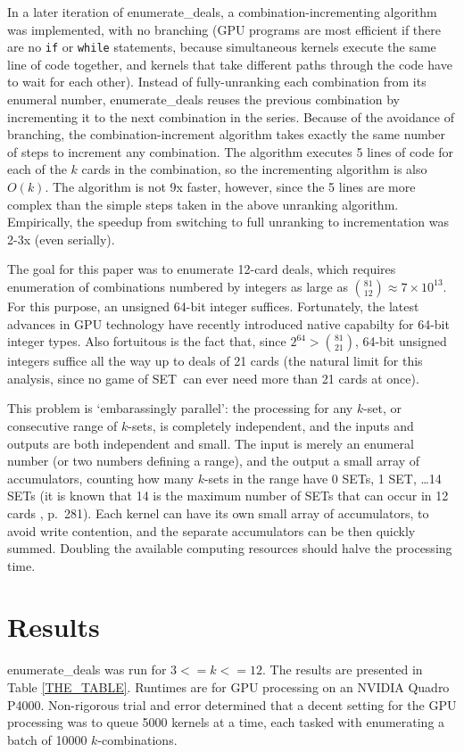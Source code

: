 \documentclass[10pt]{amsart}
\newcommand{\SETb}{SET\texttrademark\ } %
\newcommand{\ED}{{\sc enumerate\_deals}}
\newcommand{\EDb}{{\sc enumerate\_deals }}
\begin{document}
In a later iteration of \ED, a combination-incrementing algorithm was
implemented, with no branching (GPU programs are most efficient if there are no
{\tt if} or {\tt while} statements, because simultaneous kernels execute the
same line of code together, and kernels that take different paths through the
code have to wait for each other). Instead of fully-unranking each combination
from its enumeral number, \EDb reuses the previous combination by incrementing
it to the next combination in the series. Because of the avoidance of branching,
the combination-increment algorithm takes exactly the same number of steps to
increment any combination. The algorithm executes 5 lines of code for each of
the $k$ cards in the combination, so the incrementing algorithm is also
$O(k)$. The algorithm is not 9x faster, however, since the 5 lines are more
complex than the simple steps taken in the above unranking
algorithm. Empirically, the speedup from switching to full unranking to
incrementation was 2-3x (even serially).

The goal for this paper was to enumerate 12-card deals, which requires
enumeration of combinations numbered by integers as large as $\binom{81}{12}
\approx 7\times 10^{13}$. For this purpose, an unsigned 64-bit integer
suffices. Fortunately, the latest advances in GPU technology have recently
introduced native capabilty for 64-bit integer types. Also fortuitous is the
fact that, since $2^{64} > \binom{81}{21}$, 64-bit unsigned integers suffice all
the way up to deals of 21 cards (the natural limit for this analysis, since no
game of \SETb can ever need more than 21 cards at once).

This problem is `embarassingly parallel': the processing for any $k$-set, or
consecutive range of $k$-sets, is completely independent, and the inputs and
outputs are both independent and small. The input is merely an enumeral number
(or two numbers defining a range), and the output a small array of accumulators,
counting how many $k$-sets in the range have 0 SETs, 1 SET, \ldots 14 SETs (it
is known that 14 is the maximum number of SETs that can occur in 12 cards
\cite{VINCI}, \cite{JOS} p.~281). Each kernel can have its own small array of
accumulators, to avoid write contention, and the separate accumulators can be
then quickly summed. Doubling the available computing resources should halve the
processing time.

\section{Results}
\EDb was run for $3<=k<=12$. The results are presented in Table
\ref{THE_TABLE}. Runtimes are for GPU processing on an NVIDIA Quadro
P4000. Non-rigorous trial and error determined that a decent setting for the GPU
processing was to queue 5000 kernels at a time, each tasked with enumerating a
batch of 10000 $k$-combinations.
\end{document}
